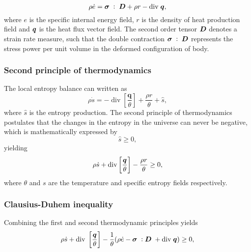 \begin{equation} \label{eq:first_principle_thermo}
    \rho\dot e = \bm{\sigma}\;:\;\bm{D} + \rho r -\text{div}\;\bm{q},
\end{equation}
where $e$ is the specific internal energy field, $r$ is the density of heat production field and $\bm{q}$ is the heat flux vector field.
The second order tensor $\bm{D}$ denotes a strain rate measure, such that the double contraction $\bm{\sigma}\;:\;\bm{D}$ represents the stress power per unit volume in the deformed configuration of body.

\subsubsection{Second principle of thermodynamics}

The local entropy balance can written as
\begin{equation}
  \rho \dot s = -\operatorname{div}\left[\frac{\bm q}{\theta}\right] + \frac{\rho r}{\theta} + \hat{s},
\end{equation}
where \(\hat{s}\) is the entropy production.
The second principle of thermodynamics postulates that the changes in the entropy in the universe can never be negative, which is mathematically expressed by
\begin{equation}
  \hat s \geq 0,
\end{equation}
yielding
\begin{equation}
    \rho\dot s +\text{div}\left[\frac{\bm{q}}{\theta}\right] -\frac{\rho r}{\theta} \geq 0,
\end{equation}
   where $\theta$ and $s$ are the temperature and specific entropy fields respectively.

\subsubsection{Clausius-Duhem inequality}

Combining the first and second thermodynamic principles yields
\begin{equation}
    \rho\dot s + \text{div}\;\left[\frac{\bm{q}}{\theta}\right] -\frac{1}{\theta}(\rho\dot e -\bm{\sigma}\;:\bm D\; +\text{div}\;\bm{q})\geq 0,
\end{equation}

